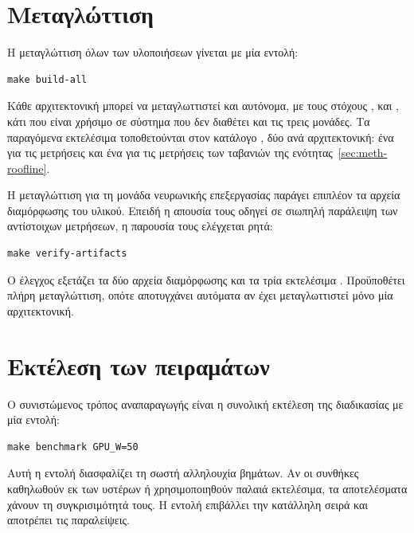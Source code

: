 \section{Μεταγλώττιση}
\label{sec:repro-build}

Η μεταγλώττιση όλων των υλοποιήσεων γίνεται με μία εντολή:

\begin{verbatim}
make build-all
\end{verbatim}

Κάθε αρχιτεκτονική μπορεί να μεταγλωττιστεί και αυτόνομα, με τους στόχους
,  και , κάτι που είναι χρήσιμο σε
σύστημα που δεν διαθέτει και τις τρεις μονάδες. Τα παραγόμενα εκτελέσιμα
τοποθετούνται στον κατάλογο , δύο ανά αρχιτεκτονική: ένα για τις
μετρήσεις  και ένα για τις μετρήσεις των ταβανιών της
ενότητας~\ref{sec:meth-roofline}.

Η μεταγλώττιση για τη μονάδα νευρωνικής επεξεργασίας παράγει επιπλέον τα αρχεία
διαμόρφωσης του υλικού. Επειδή η απουσία τους οδηγεί σε σιωπηλή παράλειψη των
αντίστοιχων μετρήσεων, η παρουσία τους ελέγχεται ρητά:

\begin{verbatim}
make verify-artifacts
\end{verbatim}

Ο έλεγχος εξετάζει τα δύο αρχεία διαμόρφωσης και τα τρία εκτελέσιμα .
Προϋποθέτει πλήρη μεταγλώττιση, οπότε αποτυγχάνει αυτόματα αν έχει
μεταγλωττιστεί μόνο μία αρχιτεκτονική.

\section{Εκτέλεση των πειραμάτων}
\label{sec:repro-run}

Ο συνιστώμενος τρόπος αναπαραγωγής είναι η συνολική εκτέλεση της διαδικασίας με
μία εντολή:

\begin{verbatim}
make benchmark GPU_W=50
\end{verbatim}

Αυτή η εντολή διασφαλίζει τη σωστή αλληλουχία βημάτων. Αν οι συνθήκες
καθηλωθούν εκ των υστέρων ή χρησιμοποιηθούν παλαιά εκτελέσιμα, τα αποτελέσματα
χάνουν τη συγκρισιμότητά τους. Η εντολή επιβάλλει την κατάλληλη σειρά και
αποτρέπει τις παραλείψεις.

